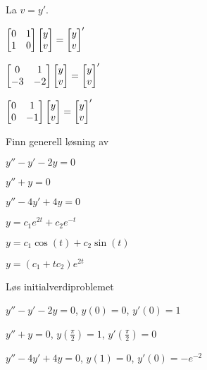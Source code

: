 \begin{losning} La $v=y'$.
	
	\begin{punkt}$\begin{bmatrix}
		0 & 1\\
		1 & 0
		\end{bmatrix} \begin{bmatrix} y \\ v \end{bmatrix}=\begin{bmatrix} y \\ v \end{bmatrix}'
		$
	\end{punkt}
	
	\begin{punkt}$\begin{bmatrix}
		0 & 1\\
		-3 & -2
		\end{bmatrix} \begin{bmatrix} y \\ v \end{bmatrix}=\begin{bmatrix} y \\ v \end{bmatrix}'
		$
	\end{punkt}
	
	\begin{punkt}$\begin{bmatrix}
		0 & 1\\
		0 & -1
		\end{bmatrix} \begin{bmatrix} y \\ v \end{bmatrix}=\begin{bmatrix} y \\ v \end{bmatrix}'
		$
	\end{punkt}
	
\end{losning}

\begin{oppgave}
Finn generell løsning av
\begin{punkt}
	$y''-y'-2y=0$
\end{punkt}

\begin{punkt}
	$y''+y=0$
\end{punkt}

\begin{punkt}
	$y''-4y'+4y=0$
\end{punkt}

\end{oppgave}

\begin{losning}
	\begin{punkt}
		$y=c_1 e^{2t}+c_2 e^{-t}$
	\end{punkt}
	
	\begin{punkt}
		$y=c_1\cos(t)+ c_2 \sin (t)$
	\end{punkt}
	
	\begin{punkt}
		$y=(c_1+tc_2)e^{2t}$
	\end{punkt}
	
\end{losning}


\begin{oppgave}
Løs initialverdiproblemet
	\begin{punkt}
		$y''-y'-2y=0$, $y(0)=0$, $y'(0)=1$
	\end{punkt}
	
	\begin{punkt}
		$y''+y=0$, $y(\frac{\pi}{2})=1$, $y'(\frac{\pi}{2})=0$
	\end{punkt}
	
	\begin{punkt}
		$y''-4y'+4y=0$, $y(1)=0$, $y'(0)=-e^{-2}$
	\end{punkt}
	
\end{oppgave}

